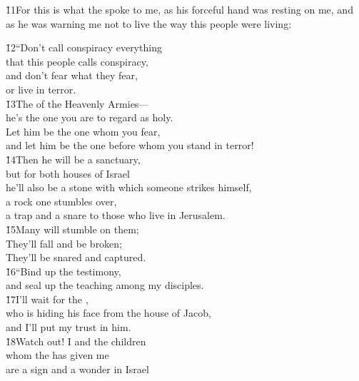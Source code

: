 \v{11}For this is what the  spoke to me, as his forceful hand was resting on me, and as he was warning me not to live the way this people were living:

\begin{poetry}
\poeml \v{12}``Don't call conspiracy everything \\
\poemll    that this people calls conspiracy, \\
\poeml and don't fear what they fear, \\
\poemll    or live in terror. \\
\poeml \v{13}The  of the Heavenly Armies--- \\
\poemll    he's the one you are to regard as holy. \\
\poeml Let him be the one whom you fear, \\
\poemll    and let him be the one before whom you stand in terror! \\
\poeml \v{14}Then he will be a sanctuary, \\
\poemll    but for both houses of Israel \\
\poeml he'll also be a stone with which someone strikes himself, \\
\poemll    a rock one stumbles over, \\
\poemlll       a trap and a snare to those who live in Jerusalem. \\
\poeml \v{15}Many will stumble on them; \\
\poemll    They'll fall and be broken; \\
\poemlll       They'll be snared and captured. \\
\poeml \v{16}``Bind up the testimony, \\
\poemll    and seal up the teaching among my disciples. \\
\poeml \v{17}I'll wait for the , \\
\poemll    who is hiding his face from the house of Jacob, \\
\poemlll       and I'll put my trust in him. \\
\poeml \v{18}Watch out! I and the children \\
\poemll    whom the  has given me \\
\poeml are a sign and a wonder in Israel \\

\end{poetry}
